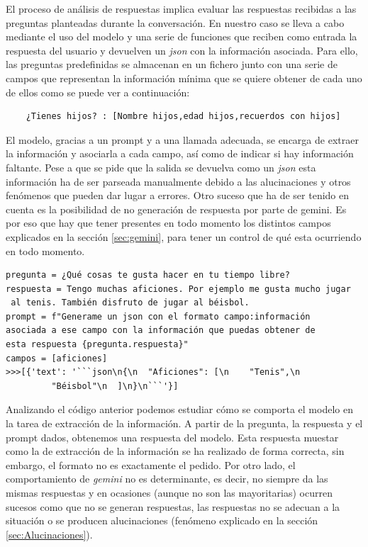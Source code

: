El proceso de análisis de respuestas implica evaluar las respuestas recibidas a las preguntas planteadas durante la conversación. En nuestro caso se lleva a cabo mediante el uso del modelo y una serie de funciones que reciben como entrada la respuesta del usuario y devuelven un \textit{json} con la información asociada. Para ello, las preguntas predefinidas se almacenan en un fichero junto con una serie de campos que representan la información mínima que se quiere obtener de cada uno de ellos como se puede ver a continuación:
\begin{verbatim}
	¿Tienes hijos? : [Nombre hijos,edad hijos,recuerdos con hijos]
\end{verbatim}

El modelo, gracias a un prompt y a una llamada adecuada, se encarga de extraer la información y asociarla a cada campo, así como de indicar si hay información faltante. Pese a que se pide que la salida se devuelva como un \textit{json} esta información ha de ser parseada manualmente debido a las alucinaciones y otros fenómenos que pueden dar lugar a errores. Otro suceso que ha de ser tenido en cuenta es la posibilidad de no generación de respuesta por parte de gemini. Es por eso que hay que tener presentes en todo momento los distintos campos explicados en la sección \ref{sec:gemini}, para tener un control de qué esta ocurriendo en todo momento. 
\begin{verbatim}
pregunta = ¿Qué cosas te gusta hacer en tu tiempo libre?	
respuesta = Tengo muchas aficiones. Por ejemplo me gusta mucho jugar
 al tenis. También disfruto de jugar al béisbol.
prompt = f"Generame un json con el formato campo:información 
asociada a ese campo con la información que puedas obtener de 
esta respuesta {pregunta.respuesta}"
campos = [aficiones]
>>>[{'text': '```json\n{\n  "Aficiones": [\n    "Tenis",\n   
		 "Béisbol"\n  ]\n}\n```'}]
\end{verbatim}
Analizando el código anterior podemos estudiar cómo se comporta el modelo en la tarea de extracción de la información. A partir de la pregunta, la respuesta y el prompt dados, obtenemos una respuesta del modelo. Esta respuesta muestar como la de extracción de la información se ha realizado de forma correcta, sin embargo, el formato no es exactamente el pedido. Por otro lado, el comportamiento de \textit{gemini} no es determinante, es decir, no siempre da las mismas respuestas y en ocasiones (aunque no son las mayoritarias) ocurren sucesos como que no se generan respuestas, las respuestas no se adecuan a la situación o se producen alucinaciones (fenómeno explicado en la sección \ref{sec:Alucinaciones}). 


